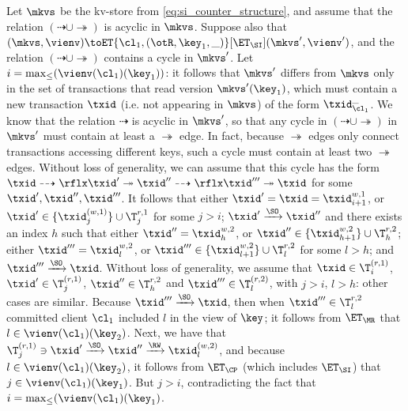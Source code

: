 Let $\mkvs$ be the kv-store from \cref{eq:si_counter_structure}, and assume that the relation $(\dashrightarrow \cup \twoheadrightarrow)$ 
is acyclic in $\mkvs$. Suppose also that 
$(\mkvs, \vienv) \toET{\cl_{1}, (\otR, \key_{1}, \_)}[\ET_\SI] (\mkvs', \vienv')$, and the relation
$(\dashrightarrow \cup \twoheadrightarrow)$ contains a cycle in $\mkvs'$. Let $i = \max_{\leq}(\vienv(\cl_1)(\key_1))$: 
it follows that $\mkvs'$ differs from $\mkvs$ only in the set of transactions that read version $\mkvs'(\key_{1})$, 
which must contain a new transaction $\txid$ (i.e. not appearing in $\mkvs$) of the form $\txid_{\cl_{1}}^{\_}$.
We know that the relation $\dashrightarrow$ is acyclic in $\mkvs'$, so that 
any cycle in $(\dashrightarrow \cup \twoheadrightarrow)$ in $\mkvs'$ must contain at least a $\twoheadrightarrow$ 
edge. In fact, because $\twoheadrightarrow$ edges only connect transactions accessing different keys, such 
a cycle must contain at least two $\twoheadrightarrow$ edges. Without loss of generality, we can assume that 
this cycle has the form $\txid \dashrightarrow\rflx \txid' \twoheadrightarrow \txid'' \dashrightarrow\rflx \txid''' \twoheadrightarrow \txid$ 
for some $\txid', \txid'', \txid'''$. It follows that either $\txid' = \txid = \txid^{w,1}_{i+1}$, or $\txid' \in \{\txid^{(w,1)}_{j}\} \cup \T^{r,1}_{j}$ 
for some $j > i$;  $\txid' \xrightarrow{\SO} \txid''$ and there exists an index $h$ such that either $\txid'' = \txid^{w,2}_{h}$, 
or $\txid'' \in \{\txid^{w,2}_{h+1}\} \cup \T^{r,2}_{h}$; 
either $\txid''' = \txid^{w,2}_{l}$, or $\txid''' \in \{\txid^{w,2}_{l+1}\} \cup \T^{r,2}_{l}$ for some $l > h$; and $\txid''' \xrightarrow{\SO} \txid$.
Without loss of generality, we assume that $\txid \in \T^{(r,1)}_{i}$, 
$\txid' \in \T^{(r,1)}_{j}$, $\txid'' \in \T^{r,2}_{h}$ and $\txid''' \in \T^{(r,2)}_{l}$, with $j > i$, $l > h$: other cases are similar. 
Because $\txid''' \xrightarrow{\SO} \txid$, then when $\txid''' \in \T^{r,2}_{l}$ committed client $\cl_1$ included $l$ 
in the view of $\key$; it follows from $\ET_{\MR}$  
that $l \in \vienv(\cl_{1})(\key_{2})$. Next, we have that $\T^{(r,1)}_{j} \ni \txid' \xrightarrow{\SO} \txid'' \xrightarrow{\RW} \txid^{(w,2)}_{l}$, 
and because $l \in \vienv(\cl_{1})(\key_{2})$, it follows from $\ET_{\CP}$ (which includes $\ET_{\SI}$) that 
$j \in \vienv(\cl_{1})(\key_{1})$. But $j > i$, contradicting the fact that $i = \max_{\leq}(\vienv(\cl_1)(\key_1)$.

